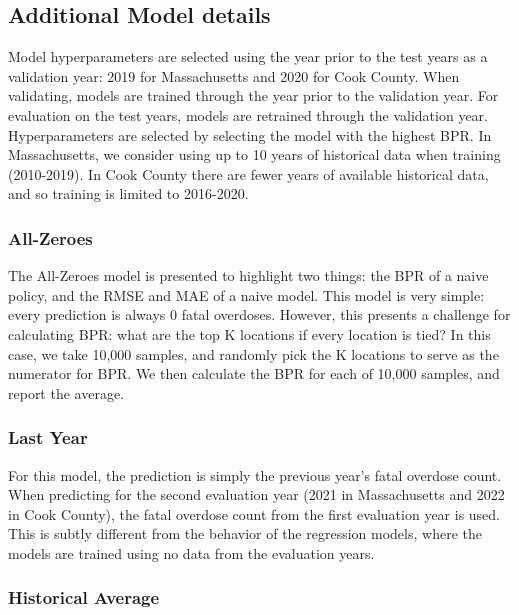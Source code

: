 \subsection{Additional Model details}\label{additional-model-details}

Model hyperparameters are selected using the year prior to the test years as a validation year: 2019 for Massachusetts and 2020 for Cook County. When validating, models are trained through the year prior to the validation year. For evaluation on the test years, models are retrained through the validation year. Hyperparameters are selected by selecting the model with the highest BPR. In Massachusetts, we consider using up to 10 years of historical data when training (2010-2019). In Cook County there are fewer years of available historical data, and so training is limited to 2016-2020.

\subsubsection{All-Zeroes}\label{all-zeroes}

The All-Zeroes model is presented to highlight two things: the BPR of a naive policy, and the RMSE and MAE of a naive model. This model is very simple: every prediction is always 0 fatal overdoses. However, this presents a challenge for calculating BPR: what are the top K locations if every location is tied? In this case, we take 10,000 samples, and randomly pick the K locations to serve as the numerator for BPR. We then calculate the BPR for each of 10,000 samples, and report the average.

\subsubsection{Last Year}\label{last-year}

For this model, the prediction is simply the previous year's fatal overdose count. When predicting for the second evaluation year (2021 in Massachusetts and 2022 in Cook County), the fatal overdose count from the first evaluation year is used. This is subtly different from the behavior of the regression models, where the models are trained using no data from the evaluation years.

\subsubsection{Historical Average}\label{historical-average}

